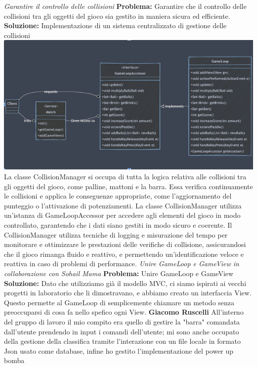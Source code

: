 \documentclass[a4paper,12pt]{report}
\begin{document}
\newline
\newline
\textit{Garantire il controllo delle collisioni}\newline\newline
\textbf{Problema:} Garantire che il controllo delle collisioni tra gli oggetti del gioco sia gestito in maniera sicura ed efficiente.\newline
\textbf{Soluzione:} Implementazione di un sistema centralizzato di gestione delle collisioni \newline
\includegraphics[width=\textwidth]{facadeSingleton.png}
La classe CollisionManager si occupa di tutta la logica relativa alle collisioni tra gli oggetti del gioco, come palline, mattoni e la barra. Essa verifica continuamente le collisioni e applica le conseguenze appropriate, come l'aggiornamento del punteggio o l'attivazione di potenziamenti. La classe CollisionManager utilizza un'istanza di GameLoopAccessor per accedere agli elementi del gioco in modo controllato, garantendo che i dati siano gestiti in modo sicuro e coerente.
Il CollisionManager utilizza tecniche di logging e misurazione del tempo per monitorare e ottimizzare le prestazioni delle verifiche di collisione, assicurandosi che il gioco rimanga fluido e reattivo, e permettendo un'identificazione veloce e reattiva in caso di problemi di performance.
\newline
\newline
\textit{Unire GameLoop e GameView in collaborazione con Sohail Mama}
\newline
\newline
\textbf{Problema: }Unire GameLoop e GameView \newline
\textbf{Soluzione:} Dato che utilizziamo già il modello MVC, ci siamo ispirati ai vecchi progetti in laboratorio che li dimostravano, e abbiamo creato un interfaccia View. Questo permette al GameLoop di semplicemente chiamare un metodo senza preoccuparsi di cosa fa nello spefico ogni View.
\newline
\newline
\newpage
\textbf{Giacomo Ruscelli}
\newline
\newline
All'interno del gruppo di lavoro il mio compito era quello di gestire la "barra" comandata dall'utente prendendo in input i comandi dell'utente; mi sono anche occupato della gestione della classifica tramite l'interazione con un file locale in formato Json usato come database, infine ho gestito l'implementazione del power up bomba
\end{document}
